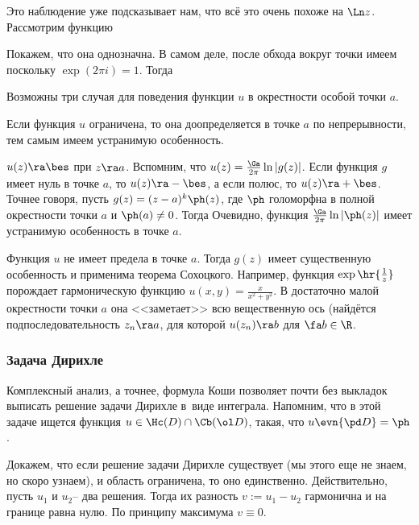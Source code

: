 \documentclass[a4paper]{article}
\begin{document}
Это наблюдение уже подсказывает нам, что всё это очень похоже на $\Ln z$. Рассмотрим функцию

Покажем, что она однозначна. В самом деле, после обхода вокруг точки имеем
поскольку $\exp(2\pi i)=1$. Тогда

Возможны три случая для поведения функции $u$ в окрестности особой точки $a$.

\begin{items}{-2}
\item Если функция $u$ ограничена, то она доопределяется в точке $a$ по непрерывности, тем самым имеем
устранимую особенность.
\item $u(z)\ra \bes$ при $z\ra a$. Вспомним, что $u(z) = \frac{\Ga}{2\pi}\ln|g(z)|$. Если функция $g$ имеет
нуль в точке $a$, то $u(z) \ra -\bes$, а если полюс, то $u(z)\ra +\bes$. Точнее говоря, пусть $g(z)=(z-a)^k\ph(z)$,
где $\ph$ голоморфна в полной окрестности точки $a$ и $\ph(a)\neq 0$. Тогда
Очевидно, функция $\frac{\Ga}{2\pi}\ln|\ph(z)|$ имеет устранимую особенность в точке $a$.
\item Функция $u$ не имеет предела в точке $a$. Тогда $g(z)$ имеет существенную особенность и  применима
теорема Сохоцкого. Например, функция $\exp\hr{\frac1z}$ порождает гармоническую функцию
$u(x,y) = \frac{x}{x^2+y^2}$. В достаточно малой окрестности точки $a$ она <<заметает>> всю вещественную
ось (найдётся подпоследовательность $z_n\ra a$, для которой $u(z_n) \ra b$ для $\fa b \in \R$.
\end{items}

\subsubsection{Задача Дирихле}

Комплексный анализ, а точнее, формула Коши позволяет почти без выкладок выписать решение задачи Дирихле
в~виде интеграла. Напомним, что в этой задаче ищется функция $u \in \Hc(D) \cap \Cb(\ol D)$, такая,
что $u\evn{\pd D} = \ph$.

Докажем, что если решение задачи Дирихле существует (мы этого еще не знаем, но скоро узнаем), и область
ограничена, то оно единственно. Действительно, пусть $u_1$ и $u_2$-- два решения. Тогда их разность
$v := u_1-u_2$ гармонична и на границе равна нулю. По принципу максимума $v \equiv 0$.
\end{document}
